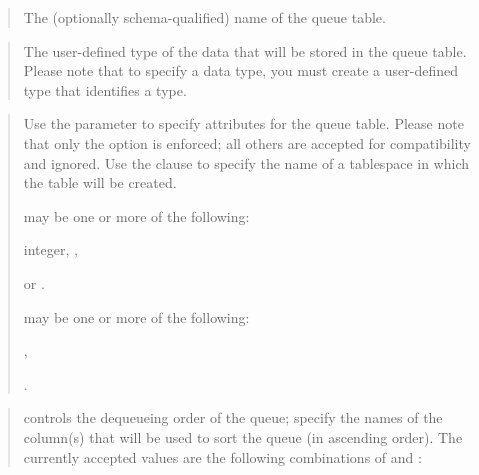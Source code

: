 \documentclass[letterpaper,10pt,english,openany,oneside]{sphinxmanual}
\begin{document}

\begin{quote}

The (optionally schema-qualified) name of the queue table.
\end{quote}

\begin{quote}

The user-defined type of the data that will be stored in the queue
table. Please note that to specify a  data type, you must create
a user-defined type that identifies a  type.
\end{quote}

\begin{quote}

Use the  parameter to specify attributes for
the queue table. Please note that only the  option is
enforced; all others are accepted for compatibility and ignored. Use
the  clause to specify the name of a tablespace in which
the table will be created.

 may be one or more of the following:

 integer, ,

 or .

 may be one or more of the following:

,


.
\end{quote}

\begin{quote}

 controls the dequeueing order of the queue; specify the
names of the column(s) that will be used to sort the queue (in
ascending order). The currently accepted values are the following
combinations of  and :




\end{quote}
\end{document}
